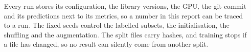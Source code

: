 \documentclass[twoside,a4paper,11pt]{article}
\begin{document}
Every run stores its configuration, the library versions, the GPU, the git commit and its predictions next to its metrics, so a number in this report can be traced to a run. The fixed seeds control the labelled subsets, the initialisation, the shuffling and the augmentation. The split files carry hashes, and training stops if a file has changed, so no result can silently come from another split.


{\footnotesize


}
\end{document}
